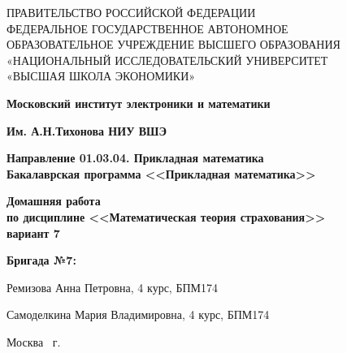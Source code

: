 \begin{titlepage}
	\begin{center}
		ПРАВИТЕЛЬСТВО РОССИЙСКОЙ ФЕДЕРАЦИИ \\
 		ФЕДЕРАЛЬНОЕ  ГОСУДАРСТВЕННОЕ АВТОНОМНОЕ \\
		ОБРАЗОВАТЕЛЬНОЕ УЧРЕЖДЕНИЕ ВЫСШЕГО ОБРАЗОВАНИЯ\\
		«НАЦИОНАЛЬНЫЙ ИССЛЕДОВАТЕЛЬСКИЙ УНИВЕРСИТЕТ\\
		«ВЫСШАЯ ШКОЛА ЭКОНОМИКИ»
	\end{center}
	
	\begin{center}
		\textbf{Московский институт электроники и математики}
		
		\textbf{Им. А.Н.Тихонова НИУ ВШЭ}
		
		\vspace{2ex}
		
		\textbf{Направление 01.03.04. Прикладная математика \\
			Бакалаврская программа <<Прикладная математика>>}
	\end{center}
	\vspace{1ex}	
	
	\vspace{1ex}
	\begin{center}
		\textbf{Домашняя работа \\
			по дисциплине <<Математическая теория страхования>>\\
			вариант 7
	}
	\end{center}	

	\vspace{2ex}
	\vfill
	
	\vspace{2ex}
	
	\begin{flushright}
		\textbf{Бригада №7:}
		
		\vspace{2ex}
		
		Ремизова Анна Петровна, 4 курс, БПМ174
		
		Самоделкина Мария Владимировна, 4 курс, БПМ174

	\end{flushright}

	\vspace{5ex}
	\begin{center}
		Москва \the\year \, г.
	\end{center}
	
\end{titlepage}
\addtocounter{page}{1}